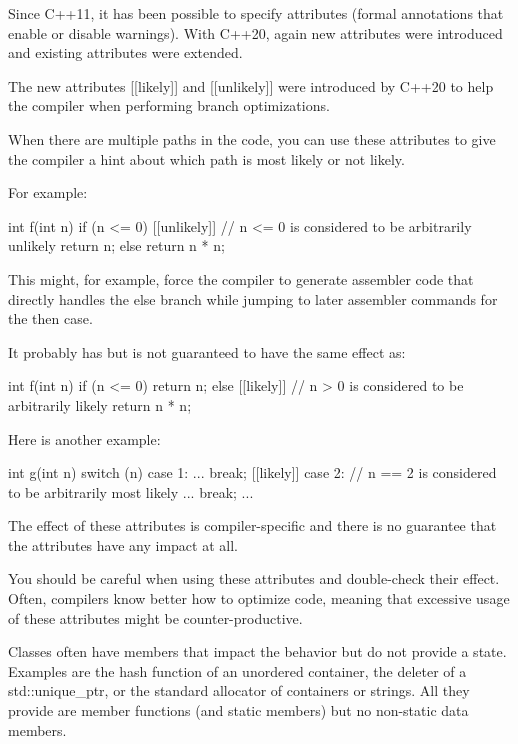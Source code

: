
Since C++11, it has been possible to specify attributes (formal annotations that enable or disable warnings). With C++20, again new attributes were introduced and existing attributes were extended.


The new attributes [[likely]] and [[unlikely]] were introduced by C++20 to help the compiler when performing branch optimizations.

When there are multiple paths in the code, you can use these attributes to give the compiler a hint about which path is most likely or not likely.

For example:

\begin{cpp}
int f(int n)
{
	if (n <= 0) [[unlikely]] { // n <= 0 is considered to be arbitrarily unlikely
		return n;
	}
	else {
		return n * n;
	}
}
\end{cpp}

This might, for example, force the compiler to generate assembler code that directly handles the else branch while jumping to later assembler commands for the then case.

It probably has but is not guaranteed to have the same effect as:

\begin{cpp}
int f(int n)
{
	if (n <= 0) {
		return n;
	}
	else [[likely]] { // n > 0 is considered to be arbitrarily likely
		return n * n;
	}
}
\end{cpp}

Here is another example:

\begin{cpp}
int g(int n)
{
	switch (n) {
		case 1:
		...
		break;
		[[likely]] case 2: // n == 2 is considered to be arbitrarily most likely
		...
		break;
	}
	...
}
\end{cpp}

The effect of these attributes is compiler-specific and there is no guarantee that the attributes have any impact at all.

You should be careful when using these attributes and double-check their effect. Often, compilers know better how to optimize code, meaning that excessive usage of these attributes might be counter-productive.


Classes often have members that impact the behavior but do not provide a state. Examples are the hash function of an unordered container, the deleter of a std::unique\_ptr, or the standard allocator of containers or strings. All they provide are member functions (and static members) but no non-static data members.

